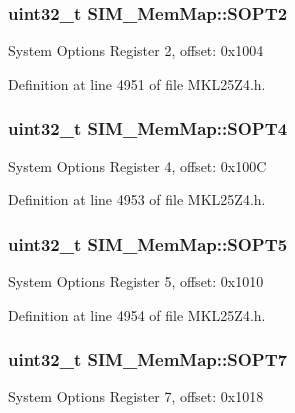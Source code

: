 \subsubsection[{\texorpdfstring{S\+O\+P\+T2}{SOPT2}}]{\setlength{\rightskip}{0pt plus 5cm}uint32\+\_\+t S\+I\+M\+\_\+\+Mem\+Map\+::\+S\+O\+P\+T2}\hypertarget{struct_s_i_m___mem_map_ae4c4bf827aeca9c2de082cdfafdea3d1}{}\label{struct_s_i_m___mem_map_ae4c4bf827aeca9c2de082cdfafdea3d1}
System Options Register 2, offset\+: 0x1004 

Definition at line 4951 of file M\+K\+L25\+Z4.\+h.

\subsubsection[{\texorpdfstring{S\+O\+P\+T4}{SOPT4}}]{\setlength{\rightskip}{0pt plus 5cm}uint32\+\_\+t S\+I\+M\+\_\+\+Mem\+Map\+::\+S\+O\+P\+T4}\hypertarget{struct_s_i_m___mem_map_adf28cda65cea7072379ec6064d0d93cc}{}\label{struct_s_i_m___mem_map_adf28cda65cea7072379ec6064d0d93cc}
System Options Register 4, offset\+: 0x100C 

Definition at line 4953 of file M\+K\+L25\+Z4.\+h.

\subsubsection[{\texorpdfstring{S\+O\+P\+T5}{SOPT5}}]{\setlength{\rightskip}{0pt plus 5cm}uint32\+\_\+t S\+I\+M\+\_\+\+Mem\+Map\+::\+S\+O\+P\+T5}\hypertarget{struct_s_i_m___mem_map_a19e2ddf391b1d9c03240be8267fdf781}{}\label{struct_s_i_m___mem_map_a19e2ddf391b1d9c03240be8267fdf781}
System Options Register 5, offset\+: 0x1010 

Definition at line 4954 of file M\+K\+L25\+Z4.\+h.

\subsubsection[{\texorpdfstring{S\+O\+P\+T7}{SOPT7}}]{\setlength{\rightskip}{0pt plus 5cm}uint32\+\_\+t S\+I\+M\+\_\+\+Mem\+Map\+::\+S\+O\+P\+T7}\hypertarget{struct_s_i_m___mem_map_a04a22056fd7d08179705d29cda1b9e2a}{}\label{struct_s_i_m___mem_map_a04a22056fd7d08179705d29cda1b9e2a}
System Options Register 7, offset\+: 0x1018 


